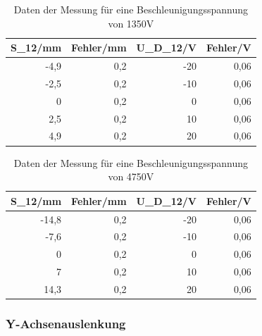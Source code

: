 \documentclass[12pt]{scrartcl}
\begin{document}
\begin{table}[htbp]
\caption{Daten der Messung für eine Beschleunigungsspannung von 1350V}
\begin{center}
\begin{tabular}{|r|r|r|r|}
\hline
\multicolumn{1}{|l|}{S\_12/mm} & \multicolumn{1}{l|}{Fehler/mm} & \multicolumn{1}{l|}{U\_D\_12/V} & \multicolumn{1}{l|}{Fehler/V} \\ \hline
-4,9 & 0,2 & -20 & 0,06 \\ \hline
-2,5 & 0,2 & -10 & 0,06 \\ \hline
0 & 0,2 & 0 & 0,06 \\ \hline
2,5 & 0,2 & 10 & 0,06 \\ \hline
4,9 & 0,2 & 20 & 0,06 \\ \hline
\end{tabular}
\end{center}
\label{tab:materialeigenschaften}
\end{table}




\begin{table}[htbp]
\caption{Daten der Messung für eine Beschleunigungsspannung von 4750V}
\begin{center}
\begin{tabular}{|r|r|r|r|}
\hline
\multicolumn{1}{|l|}{S\_12/mm} & \multicolumn{1}{l|}{Fehler/mm} & \multicolumn{1}{l|}{U\_D\_12/V} & \multicolumn{1}{l|}{Fehler/V} \\ \hline
-14,8 & 0,2 & -20 & 0,06 \\ \hline
-7,6 & 0,2 & -10 & 0,06 \\ \hline
0 & 0,2 & 0 & 0,06 \\ \hline
7 & 0,2 & 10 & 0,06 \\ \hline
14,3 & 0,2 & 20 & 0,06 \\ \hline
\end{tabular}
\end{center}
\label{tab:materialeigenschaften}
\end{table}

\newpage

\subsubsection{Y-Achsenauslenkung}
\end{document}
